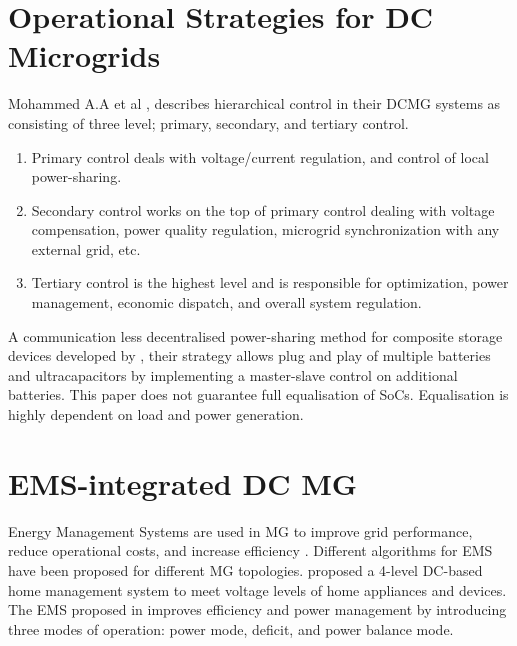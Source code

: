 \section{Operational Strategies for DC Microgrids} 
Mohammed A.A et al \cite{24}, describes hierarchical control in their DCMG systems as consisting of three level; primary, secondary, and tertiary control.
\begin{enumerate}[nolistsep]
	\item Primary control deals with voltage/current regulation, and control of local power-sharing.
	\item Secondary control works on the top of primary control dealing with voltage compensation, power quality regulation, microgrid synchronization with any external grid, etc.
	\item Tertiary control is the highest level and is responsible for optimization, power management, economic dispatch, and overall system regulation.
\end{enumerate}
A communication less decentralised power-sharing method for composite storage devices developed by \cite{25}, their strategy allows plug and play of multiple batteries and ultracapacitors by implementing a master-slave control on additional batteries. This paper does not guarantee full equalisation of SoCs. Equalisation is highly dependent on load and power generation. \par
\section{EMS-integrated DC MG}
Energy Management Systems are used in MG to improve grid performance, reduce operational costs, and increase efficiency \cite{26}. Different algorithms for EMS have been proposed for different MG topologies.\cite{27} proposed a 4-level DC-based home management system to meet voltage levels of home appliances and devices. The EMS proposed in \cite{28} improves efficiency and power management by introducing three modes of operation: power mode, deficit, and power balance mode.\par
